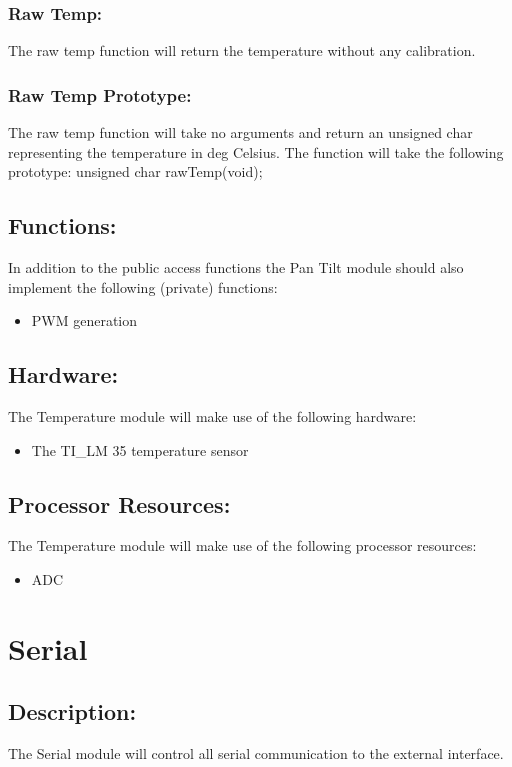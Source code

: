 \documentclass[]{article}
\begin{document}
\subsubsection{Raw Temp:}
The raw temp function will return the temperature without any calibration.

\subsubsection{Raw Temp Prototype:}
The raw temp function will take no arguments and return an unsigned char representing the temperature in deg Celsius. The function will take the following prototype: \newline \newline
unsigned char rawTemp(void);

\subsection{Functions:}
In addition to the public access functions the Pan Tilt module should also implement the following (private) functions:
\begin{itemize}
	\item PWM generation
\end{itemize}

\subsection{Hardware:}
The Temperature module will make use of the following hardware:
\begin{itemize}
	\item The TI\_LM 35 temperature sensor
\end{itemize}

\subsection{Processor Resources:}
The Temperature module will make use of the following processor resources:

\begin{itemize}
	\item ADC
\end{itemize}

\newpage
\section{Serial}

\subsection{Description:}
The Serial module will control all serial communication to the external interface.
\end{document}
